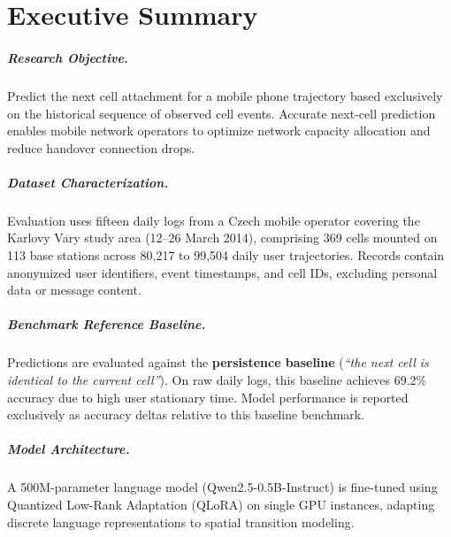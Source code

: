 \chapter*{Executive Summary}
\thispagestyle{plain}

\paragraph{Research Objective.} Predict the next cell attachment for a mobile phone trajectory based exclusively on the historical sequence of observed cell events. Accurate next-cell prediction enables mobile network operators to optimize network capacity allocation and reduce handover connection drops.

\paragraph{Dataset Characterization.} Evaluation uses fifteen daily logs from a Czech mobile operator covering the Karlovy Vary study area (12--26 March 2014), comprising 369 cells mounted on 113 base stations across 80,217 to 99,504 daily user trajectories. Records contain anonymized user identifiers, event timestamps, and cell IDs, excluding personal data or message content.

\paragraph{Benchmark Reference Baseline.} Predictions are evaluated against the \textbf{persistence baseline} (\emph{``the next cell is identical to the current cell''}). On raw daily logs, this baseline achieves 69.2\% accuracy due to high user stationary time. Model performance is reported exclusively as accuracy deltas relative to this baseline benchmark.

\paragraph{Model Architecture.} A 500M-parameter language model (Qwen2.5-0.5B-Instruct) is fine-tuned using Quantized Low-Rank Adaptation (QLoRA) on single GPU instances, adapting discrete language representations to spatial transition modeling.

